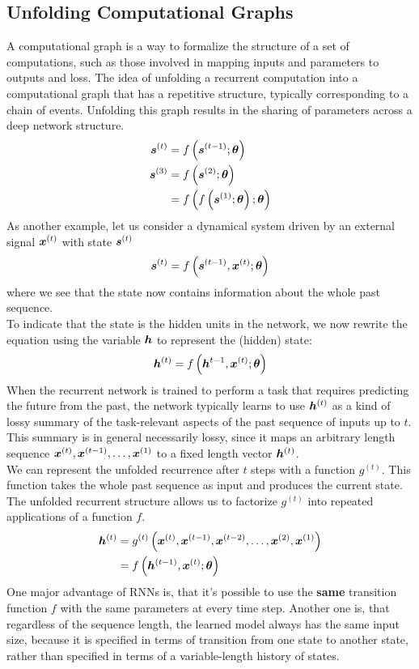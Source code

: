 \begin{multicols}{2}
	\subsection{Unfolding Computational Graphs}
	A computational graph is a way to formalize the structure of a set of computations, such as those involved in mapping inputs and parameters to outputs and loss.
	The idea of unfolding a recurrent computation into a computational graph that has a repetitive structure, typically corresponding to a chain of events.
	Unfolding this graph results in the sharing of parameters across a deep network structure.
	\begin{align*}
	\vs^{(t)} &= f\left(\vs^{(t-1)};\bolt\right)\\
	\vs^{(3)} &= f\left(\vs^{(2)};\bolt\right)\\
	&= f\left(f\left(\vs^{(1)};\bolt\right);\bolt\right)
	\end{align*}
	As another example, let us consider a dynamical system driven by an external signal ${\bm{x}}^{(t)}$ with state ${\bm{s}}^{(t)}$
	\[ \vs^{(t)} = f\left(\vs^{(t-1)},\vx^{(t)};\bolt\right) \]
	where we see that the state now contains information about the whole past sequence.\\
	
	To indicate that the state is the hidden units in the network, we now rewrite the equation using the variable ${\bm{h}}$ to represent the (hidden) state:
	\[ \vh^{(t)} = f\left(\vh^{t-1},\vx^{(t)};\bolt\right) \]
	When the recurrent network is trained to perform a task that requires predicting the future from the past, the network typically learns to use ${\bm{h}}^{(t)}$ as a kind of lossy summary of the task-relevant aspects of the past sequence of inputs up to $t$.
	This summary is in general necessarily lossy, since it maps an arbitrary length sequence ${\bm{x}}^{(t)},{\bm{x}}^{(t-1)},\dots,{\bm{x}}^{(1)}$ to a fixed length vector ${\bm{h}}^{(t)}$.\\
	
	We can represent the unfolded recurrence after $t$ steps with a function $g^{(t)}$. This function takes the whole past sequence as input and produces the current state.
	The unfolded recurrent structure allows us to factorize $g^{(t)}$ into repeated applications of a function $f$.
	\begin{align*}
	\vh^{(t)} &= g^{(t)}\left( \vx^{(t)},\vx^{(t-1)},\vx^{(t-2)},\dots,\vx^{(2)},\vx^{(1)} \right)\\
	&= f\left(\vh^{(t-1)},\vx^{(t)};\bolt\right)
	\end{align*}
	One major advantage of RNNs is, that it's possible to use the \textbf{same} transition function $f$ with the same parameters at every time step.
	Another one is, that regardless of the sequence length, the learned model always has the same input size, because it is specified in terms of transition from one state to another state, rather than specified in terms of a variable-length history of states.
	

\end{multicols}
